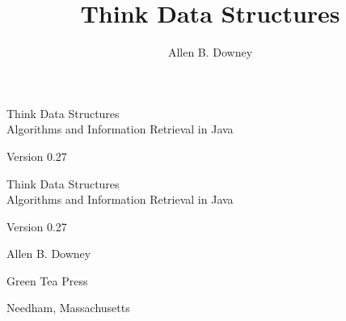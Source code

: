 \documentclass[12pt]{book}
\title{Think Data Structures}
\author{Allen B. Downey}
\newcommand{\thetitle}{Think Data Structures}
\newcommand{\thesubtitle}{Algorithms and Information Retrieval in Java}
\newcommand{\theauthors}{Allen B. Downey}
\newcommand{\theversion}{0.27}
\theoremstyle{exercise}
\newif\ifplastex
\begin{document}
\frontmatter

\ifplastex

\maketitle

\else

\begin{latexonly}

\thispagestyle{empty}

\begin{flushright}
\vspace*{2.0in}

\begin{spacing}{3}
{\huge \thetitle} \\
{\Large \thesubtitle}
\end{spacing}

\vspace{0.25in}

Version \theversion

\vfill
\end{flushright}

\newpage
\thispagestyle{empty}

\quad

\newpage
\thispagestyle{empty}

\begin{flushright}
\vspace*{2.0in}

\begin{spacing}{3}
{\huge \thetitle} \\
{\Large \thesubtitle}
\end{spacing}

\vspace{0.25in}

Version \theversion

\vspace{1in}

{\Large \theauthors}

\vspace{0.5in}

{\Large Green Tea Press}

{\small Needham, Massachusetts}

\vfill
\end{flushright}


\end{latexonly}
\end{document}

